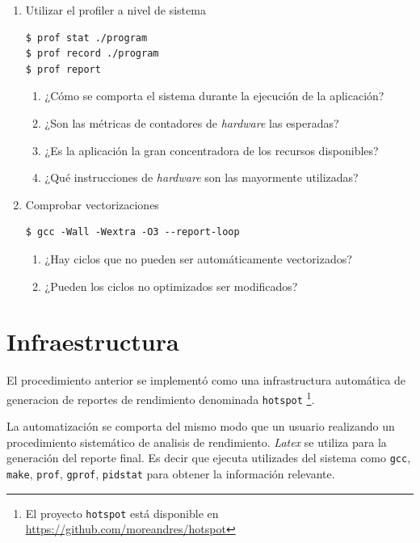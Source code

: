 \documentclass[a4paper]{report}
\begin{document}
\begin{enumerate}
\item Utilizar el profiler a nivel de sistema

\begin{lstlisting}[caption={Generación de Perfil de Sistema},label={lst:profall}]
$ prof stat ./program
$ prof record ./program
$ prof report
\end{lstlisting}

\begin{enumerate}
\item ¿Cómo se comporta el sistema durante la ejecución de la aplicación?
\item ¿Son las métricas de contadores de {\it hardware} las esperadas?
\item ¿Es la aplicación la gran concentradora de los recursos disponibles?
\item ¿Qué instrucciones de {\it hardware} son las mayormente utilizadas?
\end{enumerate}

\item Comprobar vectorizaciones

\begin{lstlisting}[caption={Información de Vectorización},label={lst:report}]
$ gcc -Wall -Wextra -O3 --report-loop
\end{lstlisting}

\begin{enumerate}
\item ¿Hay ciclos que no pueden ser automáticamente vectorizados?
\item ¿Pueden los ciclos no optimizados ser modificados?
\end{enumerate}

\end{enumerate}

\section{Infraestructura}

El procedimiento anterior se implementó como una infrastructura automática de generacion de reportes de rendimiento denominada 
{\tt hotspot} \footnote{El proyecto {\tt hotspot} está disponible en \href{https://github.com/moreandres/hotspot}{https://github.com/moreandres/hotspot}}.

\bigskip

La automatización se comporta del mismo modo que un usuario realizando un procedimiento sistemático de analisis de rendimiento.
{\it Latex} se utiliza para la generación del reporte final. Es decir que ejecuta utilizades del sistema como {\tt gcc}, {\tt make}, {\tt prof}, {\tt gprof}, {\tt pidstat} para obtener la información relevante.
\end{document}
